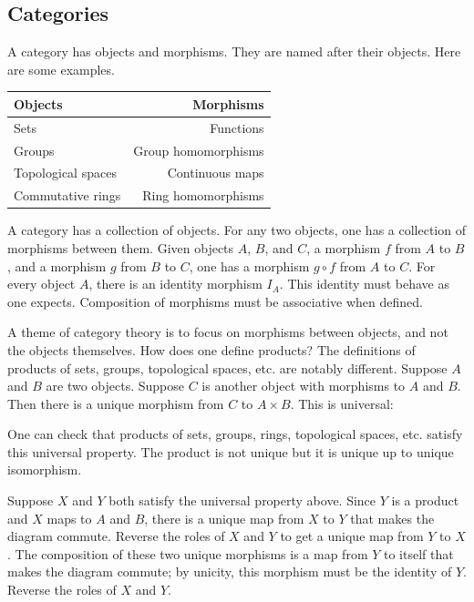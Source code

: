 \documentclass [11 pt, oneside] {article}
\begin{document}
\subsection{Categories}
A category has objects and morphisms. They are named after their objects. Here are some examples.
	\begin{center}
\begin{tabular}{lr}
    Objects & Morphisms\\
    \midrule
    Sets & Functions\\
    Groups & Group homomorphisms\\
    Topological spaces & Continuous maps\\
    Commutative rings & Ring homomorphisms
\end{tabular}
\end{center}
A category has a collection of objects. For any two objects, one has a collection of morphisms between them. Given objects $A$, $B$, and $C$, a morphism $f$ from $A$ to $B$, and a morphism $g$ from $B$ to $C$, one has a morphism $g\circ f$ from $A$ to $C$. For every object $A$, there is an identity morphism $I_A$. This identity must behave as one expects. Composition of morphisms must be associative when defined.

A theme of category theory is to focus on morphisms between objects, and not the objects themselves. How does one define products? The definitions of products of sets, groups, topological spaces, etc. are notably different. Suppose $A$ and $B$ are two objects. Suppose $C$ is another object with morphisms to $A$ and $B$. Then there is a unique morphism from $C$ to $A\times B$. This is universal:
\begin{center}
\end{center}
One can check that products of sets, groups, rings, topological spaces, etc. satisfy this universal property. The product is not unique but it is unique up to unique isomorphism.

Suppose $X$ and $Y$ both satisfy the universal property above. Since $Y$ is a product and $X$ maps to $A$ and $B$, there is a unique map from $X$ to $Y$ that makes the diagram commute. Reverse the roles of $X$ and $Y$ to get a unique map from $Y$ to $X$. The composition of these two unique morphisms is a map from $Y$ to itself that makes the diagram commute; by unicity, this morphism must be the identity of $Y$. Reverse the roles of $X$ and $Y$.
\end{document}
